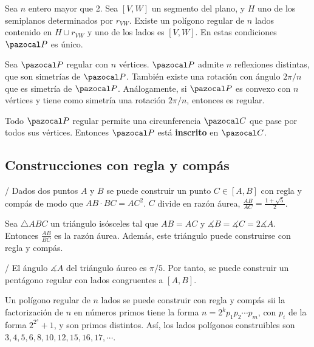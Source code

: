   Sea $n$ entero mayor que 2. Sea $[V,W]$ un segmento del plano, y $H$ uno de los semiplanos determinados por $r_{VW}$. Existe un polígono regular de $n$ lados contenido en $H \cup r_{VW}$ y uno de los lados es $[V,W]$.  En estas condiciones $\PP$ es único.
 
  Sea $\PP$ regular con $n$ vértices. $\PP$ admite $n$ reflexiones distintas, que son simetrías de $\PP$. También existe una rotación con ángulo $2\pi/n$ que es simetría de $\PP$. Análogamente, si $\PP$ es convexo con $n$ vértices y tiene como simetría una rotación $2\pi/n$, entonces es regular.
 
 Todo $\PP$ regular permite una circunferencia $\C$ que pase por todos sus vértices. Entonces $\PP$ está \textbf{inscrito} en $\C$.
\vspace{-2em}
\subsection*{Construcciones con regla y compás}
/ Dados dos puntos $A$ y $B$ se puede construir un punto $C \in [A,B]$ con regla y compás de modo que $AB\cdot BC = AC^2$. $C$ divide en razón áurea, $\frac{AB}{AC} = \frac{1+\sqrt{5}}{2}$.

 Sea $\triangle ABC$ un triángulo isósceles tal que $AB = AC$ y $\measuredangle B = \measuredangle C = 2\measuredangle A$. Entonces $\frac{AB}{BC}$ es la razón áurea. Además, este triángulo puede construirse con regla y compás.

/ El ángulo $\measuredangle A$ del triángulo áureo es $\pi/5$. Por tanto, se puede construir un pentágono regular con lados congruentes a $[A,B]$.

 Un polígono regular de $n$ lados se puede construir con regla y compás sii la factorización de $n$ en números primos tiene la forma $n = 2^kp_1p_2\cdots p_m$, con $p_i$ de la forma $2^{2^s}+1$, y son primos distintos. Así, los lados polígonos construibles son $3,4,5,6,8,10,12,15,16,17, \cdots$.



 

